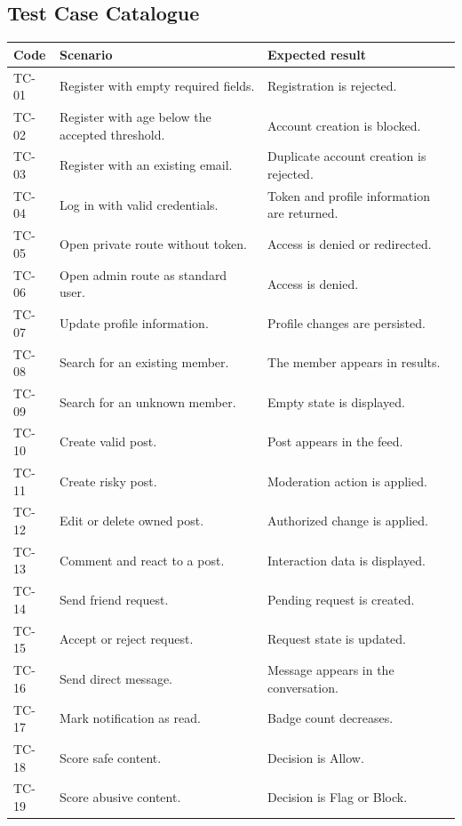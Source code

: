 \subsection{Test Case Catalogue}

\begin{longtable}{|m{2cm}|m{5.1cm}|m{6.5cm}|}
\hline
\textbf{Code} & \textbf{Scenario} & \textbf{Expected result} \\
\hline
TC-01 & Register with empty required fields. & Registration is rejected. \\
\hline
TC-02 & Register with age below the accepted threshold. & Account creation is blocked. \\
\hline
TC-03 & Register with an existing email. & Duplicate account creation is rejected. \\
\hline
TC-04 & Log in with valid credentials. & Token and profile information are returned. \\
\hline
TC-05 & Open private route without token. & Access is denied or redirected. \\
\hline
TC-06 & Open admin route as standard user. & Access is denied. \\
\hline
TC-07 & Update profile information. & Profile changes are persisted. \\
\hline
TC-08 & Search for an existing member. & The member appears in results. \\
\hline
TC-09 & Search for an unknown member. & Empty state is displayed. \\
\hline
TC-10 & Create valid post. & Post appears in the feed. \\
\hline
TC-11 & Create risky post. & Moderation action is applied. \\
\hline
TC-12 & Edit or delete owned post. & Authorized change is applied. \\
\hline
TC-13 & Comment and react to a post. & Interaction data is displayed. \\
\hline
TC-14 & Send friend request. & Pending request is created. \\
\hline
TC-15 & Accept or reject request. & Request state is updated. \\
\hline
TC-16 & Send direct message. & Message appears in the conversation. \\
\hline
TC-17 & Mark notification as read. & Badge count decreases. \\
\hline
TC-18 & Score safe content. & Decision is Allow. \\
\hline
TC-19 & Score abusive content. & Decision is Flag or Block. \\

\end{longtable}
